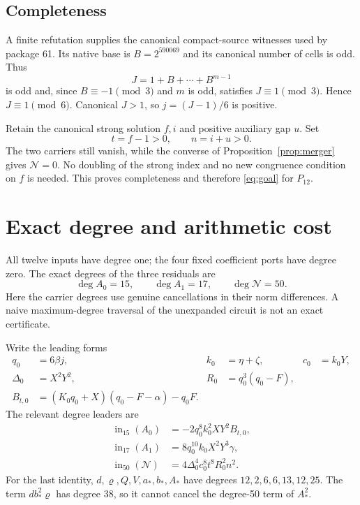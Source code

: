 \documentclass[11pt]{article}
\theoremstyle{remark}\newtheorem{remark}[theorem]{Remark}
\begin{document}
\subsection{Completeness}

A finite refutation supplies the canonical compact-source witnesses used by package 61. Its native base is $B=2^{590069}$ and its canonical number of cells is odd. Thus
\[
 J=1+B+\cdots+B^{m-1}
\]
is odd and, since $B\equiv-1\pmod3$ and $m$ is odd, satisfies $J\equiv1\pmod3$. Hence $J\equiv1\pmod6$. Canonical $J>1$, so $j=(J-1)/6$ is positive.

Retain the canonical strong solution $f,i$ and positive auxiliary gap $u$. Set
\[
 t=f-1>0,\qquad n=i+u>0.
\]
The two carriers still vanish, while the converse of Proposition~\ref{prop:merger} gives $\mathcal N=0$. No doubling of the strong index and no new congruence condition on $f$ is needed. This proves completeness and therefore \eqref{eq:goal} for $P_{12}$.

\section{Exact degree and arithmetic cost}\label{sec:degree}

All twelve inputs have degree one; the four fixed coefficient ports have degree zero. The exact degrees of the three residuals are
\[
 \deg A_0=15,\qquad \deg A_1=17,\qquad \deg\mathcal N=50.
\]
Here the carrier degrees use genuine cancellations in their norm differences. A naive maximum-degree traversal of the unexpanded circuit is not an exact certificate.

Write the leading forms
\begin{align*}
 q_0&=6\beta j,& k_0&=\eta+\zeta,& c_0&=k_0Y,\\
 \Delta_0&=X^2Y^2,& R_0&=q_0^3(q_0-F),\\
 B_{t,0}&=(K_0q_0+X)(q_0-F-\alpha)-q_0F.
\end{align*}
The relevant degree leaders are
\begin{align*}
 \operatorname{in}_{15}(A_0)&=-2q_0^8k_0^2XY^2B_{t,0},\\
 \operatorname{in}_{17}(A_1)&=8q_0^{10}k_0X^2Y^3\gamma,\\
 \operatorname{in}_{50}(\mathcal N)&=4\Delta_0^4c_0^8t^8R_0^2n^2.
\end{align*}
For the last identity, $d,\varrho,Q,V,a_*,b_*,A_*$ have degrees $12,2,6,6,13,12,25$. The term $db_*^2\varrho$ has degree 38, so it cannot cancel the degree-50 term of $A_*^2$.
\end{document}
